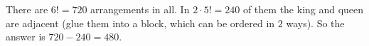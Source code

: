 There are $6!=720$ arrangements in all. In $2\cdot5!=240$ of them the king and queen are adjacent (glue them into a block, which can be ordered in $2$ ways). So the answer is $720-240=\boxed{480}$.
